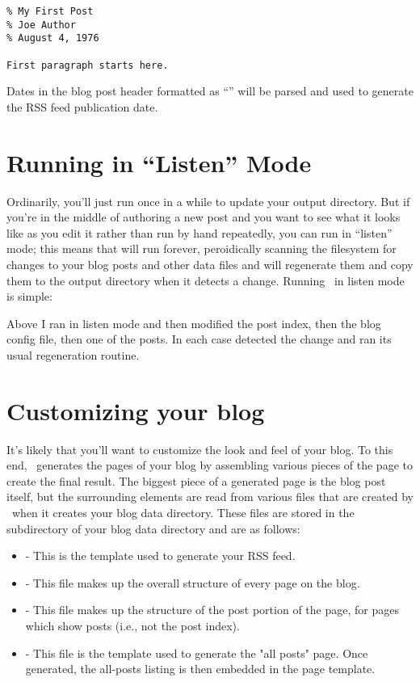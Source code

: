 \documentclass[11pt, letterpaper, oneside, titlepage]{book}
\begin{document}
\begin{verbatim}
% My First Post
% Joe Author
% August 4, 1976

First paragraph starts here.
\end{verbatim}

Dates in the blog post header formatted as ``'' will be parsed and used to generate the RSS feed
publication date.

\section{Running  in ``Listen'' Mode}

Ordinarily, you'll just run  once in a while to update your
output directory.  But if you're in the middle of authoring a new post
and you want to see what it looks like as you edit it rather than run
 by hand repeatedly, you can run  in ``listen'' mode;
this means that  will run forever, peroidically scanning the
filesystem for changes to your blog posts and other data files and
will regenerate them and copy them to the output directory when it
detects a change.  Running \mathblog\ in listen mode is simple:


Above I ran  in listen mode and then modified the post index,
then the blog config file, then one of the posts.  In each case
 detected the change and ran its usual regeneration routine.

\section{Customizing your blog}
\label{ref:customizing}

It's likely that you'll want to customize the look and feel of your
blog.  To this end, \mathblog\ generates the pages of your blog by
assembling various pieces of the page to create the final result.  The
biggest piece of a generated page is the blog post itself, but the
surrounding elements are read from various files that are created by
\mathblog\ when it creates your blog data directory.  These files are
stored in the  subdirectory of your blog data directory
and are as follows:

\begin{itemize}
\item{ - This is the template used to
  generate your RSS feed.}
\item{ - This file makes up the
  overall structure of every page on the blog.}
\item{ - This file makes up the
  structure of the post portion of the page, for pages which show
  posts (i.e., not the post index).}
\item{ - This file is the template
  used to generate the "all posts" page.  Once generated, the
  all-posts listing is then embedded in the page template.}
\end{itemize}
\end{document}
